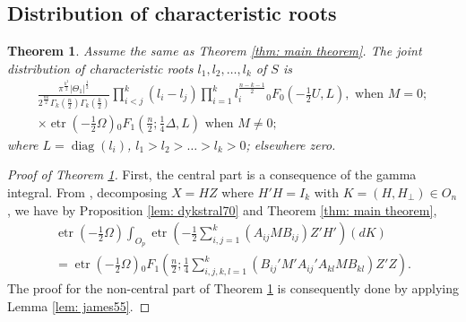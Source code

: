 \documentclass{amsart}
\newtheorem{theorem}{Theorem}[section]
\theoremstyle{definition}
\numberwithin{equation}{section}
\begin{document}
\subsection{Distribution of characteristic roots}
\begin{theorem} \label{thm: main theorem 3} Assume the same as Theorem \ref{thm: main theorem}. The joint distribution of characteristic roots $l_{1}, l_{2}, \dots, l_{k}$ of  $ S$ is 
        \[\begin{aligned}
        			\frac{\pi^{\frac{k^{2}}{2}}| \varTheta_{1}|^{\frac{1}{2}}}{2^{\frac{nk}{2}}\varGamma_{k}(\frac{n}{2})\varGamma_{k}(\frac{k}{2})}
                    \prod_{i<j}^{k} (l_{i} - l_{j}) 
                    \prod_{i=1}^{k}l_{i}^{\frac{n-k-1}{2}}
                    {}_0F_{0}\left(-\frac{1}{2}  U,  L\right),  \text{ when } {M}=0;\\
        \times \operatorname{etr} \left(-\frac{1}{2} \Omega\right){}_{0}F_{1}\left(\frac{n}{2};\frac{1}{4} \Delta, L\right) \text{ when } {M}\neq0; 
        \end{aligned}\]
where $ L = \operatorname{diag}(l_i)$, $l_{1} > l_{2} > \dots > l_{k}>0$; elsewhere zero.
\end{theorem}

    \begin{proof}[Proof of Theorem \ref{thm: main theorem 3}]
     First, the central part is a consequence of the gamma integral. From \cite[Theorem 3.2.17]{muirhead1982aspects}, decomposing $ X =  H  Z$ where $H' H =  I_k$ with $K = (H,H_{\perp}) \in O_n$, we have by Proposition \ref{lem: dykstral70} and Theorem \ref{thm: main theorem},
    \[\begin{aligned}
        \operatorname{etr} \left(-\frac{1}{2}  \Omega\right)\int_{O_p}\operatorname{etr}\left(-\frac{1}{2}\sum_{i,j=1}^{k}( A_{ij} MB_{ij}) Z' H'\right)(d K) \\
        = \operatorname{etr} \left(-\frac{1}{2}  \Omega\right){}_{0}F_{1}\left(\frac{n}{2};\frac{1}{4}\sum_{i,j,k,l=1}^{k}( B_{ij}' M' A_{ij}' A_{kl} M B_{kl}) Z' Z\right).
    \end{aligned}\]
    The proof for the non-central part of Theorem \ref{thm: main theorem 3} is consequently done by applying Lemma \ref{lem: james55}. 
    \end{proof}
\end{document}
